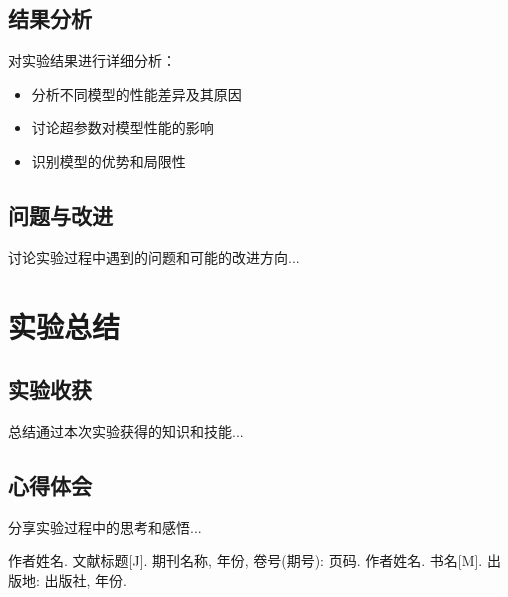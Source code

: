 \documentclass[a4paper,11pt]{article}
\begin{document}
\subsection{结果分析}
对实验结果进行详细分析：
\begin{itemize}
    \item 分析不同模型的性能差异及其原因
    \item 讨论超参数对模型性能的影响
    \item 识别模型的优势和局限性
\end{itemize}

\subsection{问题与改进}
讨论实验过程中遇到的问题和可能的改进方向...

\section{实验总结}
\subsection{实验收获}
总结通过本次实验获得的知识和技能...

\subsection{心得体会}
分享实验过程中的思考和感悟...

\begin{thebibliography}{9}
 作者姓名. 文献标题[J]. 期刊名称, 年份, 卷号(期号): 页码.
 作者姓名. 书名[M]. 出版地: 出版社, 年份.
\end{thebibliography}
\end{document}
